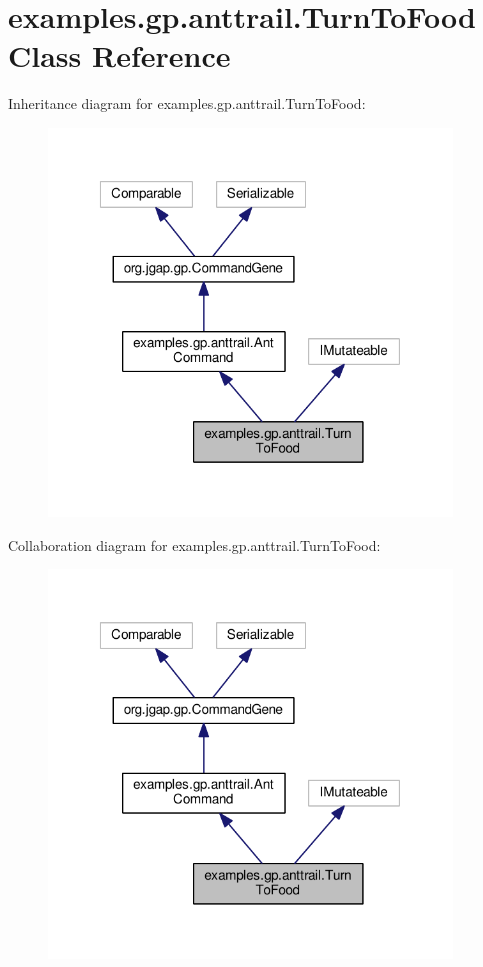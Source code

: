 \hypertarget{classexamples_1_1gp_1_1anttrail_1_1_turn_to_food}{\section{examples.\-gp.\-anttrail.\-Turn\-To\-Food Class Reference}
\label{classexamples_1_1gp_1_1anttrail_1_1_turn_to_food}
}


Inheritance diagram for examples.\-gp.\-anttrail.\-Turn\-To\-Food\-:
\nopagebreak
\begin{figure}[H]
\begin{center}
\leavevmode
\includegraphics[width=304pt]{classexamples_1_1gp_1_1anttrail_1_1_turn_to_food__inherit__graph}
\end{center}
\end{figure}


Collaboration diagram for examples.\-gp.\-anttrail.\-Turn\-To\-Food\-:
\nopagebreak
\begin{figure}[H]
\begin{center}
\leavevmode
\includegraphics[width=304pt]{classexamples_1_1gp_1_1anttrail_1_1_turn_to_food__coll__graph}
\end{center}
\end{figure}
